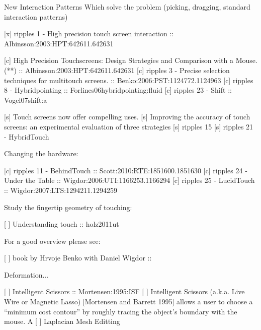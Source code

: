 New Interaction Patterns Which solve the problem (picking, dragging, standard interaction patterns)

[x] ripples 1  - High precision touch screen interaction :: Albinsson:2003:HPT:642611.642631

[c] High Precision Touchscreens: Design Strategies and Comparison with a Mouse. (**) :: Albinsson:2003:HPT:642611.642631
[c] ripples 3 - Precise selection techniques for multitouch screens. :: Benko:2006:PST:1124772.1124963
[c] ripples 8 - Hybridpointing :: Forlines06hybridpointing:fluid
[c] ripples 23 - Shift :: Vogel07shift:a

[s] Touch screens now offer compelling uses.
[s] Improving the accuracy of touch screens: an experimental evaluation of three strategies
[s] ripples 15
[s] ripples 21 - HybridTouch

Changing the hardware:

[c] ripples 11 - BehindTouch :: Scott:2010:RTE:1851600.1851630
[c] ripples 24 - Under the Table :: Wigdor:2006:UTI:1166253.1166294
[c] ripples 25 - LucidTouch :: Wigdor:2007:LTS:1294211.1294259

Study the fingertip geometry of touching:

[ ] Understanding touch :: holz2011ut

For a good overview please see:

[ ] book by Hrvoje Benko with Daniel Wigdor :: \cite{Benko:Fatfinger}

Deformation...

[ ] Intelligent Scissors :: Mortensen:1995:ISF
	[ ] Intelligent Scissors (a.k.a. Live Wire or Magnetic Lasso)
	[Mortensen and Barrett 1995] allows a user to choose a “minimum
	cost contour” by roughly tracing the object’s boundary with the
	mouse. A
[ ] Laplacian Mesh Editting ~\cite{Sorkine:2004:LSE}

